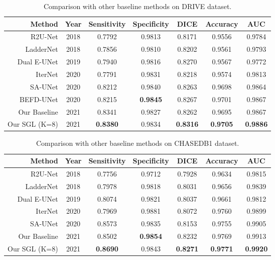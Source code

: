\documentclass[runningheads]{llncs}
\begin{document}
\begin{table}[t]\setlength{\tabcolsep}{5pt}
\centering
\footnotesize
\caption{Comparison with other baseline methods on DRIVE dataset. }
\begin{tabular}{|r|c|c|c|c|c|c|}
\hline
Method & Year & Sensitivity & Specificity & DICE & Accuracy & AUC \\ \hline
R2U-Net \cite{alom2019recurrent}    & 2018 &0.7792 &0.9813 &0.8171 &0.9556 &0.9784\\
LadderNet \cite{zhuang2018laddernet} & 2018 &0.7856 &0.9810 &0.8202 &0.9561 &0.9793\\
Dual E-UNet \cite{wang2019dual}   &2019 &0.7940 &0.9816 &0.8270 &0.9567 &0.9772\\
IterNet \cite{li2020iternet}     &2020 &0.7791 &0.9831 &0.8218 &0.9574 &0.9813\\
SA-UNet \cite{guo2020sa}     &2020 &0.8212 &0.9840 &0.8263 &0.9698 &0.9864\\
BEFD-UNet \cite{zhang2020befd}& 2020 &0.8215 &\bf{0.9845} &0.8267& 0.9701& 0.9867 \\\hline
Our Baseline &2021 &0.8341 &0.9827 &0.8262 &0.9695 &0.9867 \\ 
Our SGL (K=8) &2021&\bf{0.8380} &0.9834 &\bf{0.8316} &\bf{0.9705} &\bf{0.9886} \\\hline

\end{tabular}\label{exp:drive}
\end{table}

\begin{table}[t]\setlength{\tabcolsep}{5pt}
\centering
\footnotesize
\caption{Comparison with other baseline methods on CHASEDB1 dataset. }
\begin{tabular}{|r|c|c|c|c|c|c|}
\hline
Method & Year & Sensitivity & Specificity & DICE & Accuracy & AUC \\\hline
R2U-Net \cite{alom2019recurrent}    & 2018 &0.7756 &0.9712 &0.7928&0.9634 &0.9815\\
LadderNet \cite{zhuang2018laddernet} & 2018 &0.7978 &0.9818 &0.8031 &0.9656 &0.9839\\

Dual E-UNet \cite{wang2019dual}   &2019 &0.8074 &0.9821 &0.8037 &0.9661 &0.9812\\
IterNet \cite{li2020iternet}     &2020 &0.7969 &0.9881 &0.8072 &0.9760 &0.9899\\
SA-UNet \cite{guo2020sa}     &2020 &0.8573 &0.9835 &0.8153 &0.9755 &0.9905\\

\hline
Our Baseline &2021 &0.8502 &\bf{0.9854} &0.8232 &0.9769 &0.9913 \\ 
 Our SGL (K=8) &2021&\bf{0.8690} &0.9843 &\bf{0.8271} &\bf{0.9771} &\bf{0.9920} \\\hline
\end{tabular}\label{exp:chase}
\vspace{-4mm}
\end{table}
\end{document}
